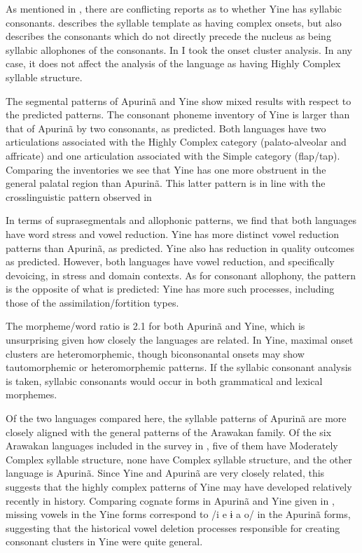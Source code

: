   As mentioned in , there are conflicting reports as to whether Yine has syllabic consonants. \citet{Matteson1965} describes the syllable template as having complex onsets, but also describes the consonants which do not directly precede the nucleus as being syllabic allophones of the consonants. In  I took the onset cluster analysis. In any case, it does not affect the analysis of the language as having Highly Complex syllable structure.

  The segmental patterns of Apurinã and Yine show mixed results with respect to the predicted patterns. The consonant phoneme inventory of Yine is larger than that of Apurinã by two consonants, as predicted. Both languages have two articulations associated with the Highly Complex category (palato-alveolar and affricate) and one articulation associated with the Simple category (flap/tap). Comparing the inventories we see that Yine has one more obstruent in the general palatal region than Apurinã. This latter pattern is in line with the crosslinguistic pattern observed in 

  In terms of suprasegmentals and allophonic patterns, we find that both languages have word stress and vowel reduction. Yine has more distinct vowel reduction patterns than Apurinã, as predicted. Yine also has reduction in quality outcomes as predicted. However, both languages have vowel reduction, and specifically devoicing, in stress and domain contexts. As for consonant allophony, the pattern is the opposite of what is predicted: Yine has more such processes, including those of the assimilation/fortition types.

  The morpheme/word ratio is 2.1 for both Apurinã and Yine, which is unsurprising given how closely the languages are related. In Yine, maximal onset clusters are heteromorphemic, though biconsonantal onsets may show tautomorphemic or heteromorphemic patterns. If the syllabic consonant analysis is taken, syllabic consonants would occur in both grammatical and lexical morphemes.

  Of the two languages compared here, the syllable patterns of Apurinã are more closely aligned with the general patterns of the Arawakan family. Of the six Arawakan languages included in the survey in \citet{Maddieson2013a}, five of them have Moderately Complex syllable structure, none have Complex syllable structure, and the other language is Apurinã. Since Yine and Apurinã are very closely related, this suggests that the highly complex patterns of Yine may have developed relatively recently in history. Comparing cognate forms in Apurinã and Yine given in \citet[88-9]{Facundes2002}, missing vowels in the Yine forms correspond to /i e ɨ a o/ in the Apurinã forms, suggesting that the historical vowel deletion processes responsible for creating consonant clusters in Yine were quite general.

